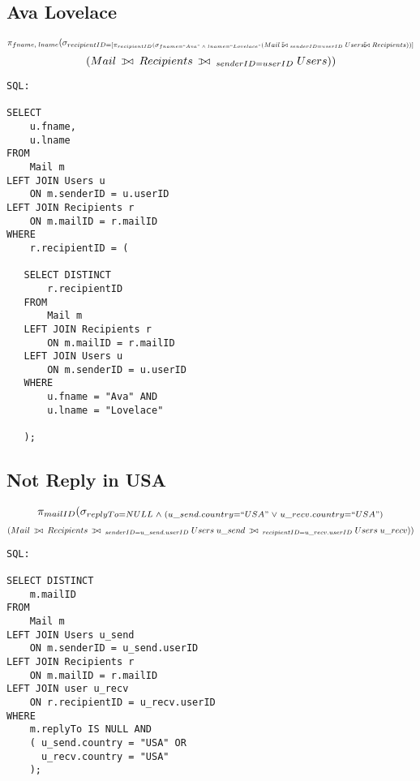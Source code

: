 \documentclass[12pt, letterpaper]{report}
\def\ojoin{\setbox0=\hbox{$\bowtie$}
\rule[-.02ex]{.25em}{.4pt}\llap{\rule[\ht0]{.25em}{.4pt}}}
\def\leftouterjoin{\mathbin{\ojoin\mkern-5.8mu\bowtie}}
\begin{document}
\subsection{Ava Lovelace}


\[ \pi_{fname,\;lname} (\sigma_{recipientID=[\pi_{recipientID} (\sigma_{fname=``Ava"\;\wedge\;lname=``Lovelace"} (Mail\;\leftouterjoin\;_{senderID=userID}\;Users\leftouterjoin\;Recipients ))]} \]
\[ (Mail\;\leftouterjoin\;Recipients\;\leftouterjoin\;_{senderID=userID}\;Users ))  \]


\begin{verbatim}
SQL:

SELECT
    u.fname,
    u.lname
FROM
    Mail m
LEFT JOIN Users u
    ON m.senderID = u.userID
LEFT JOIN Recipients r
    ON m.mailID = r.mailID
WHERE
    r.recipientID = (
    
   SELECT DISTINCT
       r.recipientID
   FROM 
       Mail m
   LEFT JOIN Recipients r
       ON m.mailID = r.mailID
   LEFT JOIN Users u
       ON m.senderID = u.userID
   WHERE
       u.fname = "Ava" AND
       u.lname = "Lovelace"

   );

\end{verbatim}

\subsection{Not Reply in USA}


\[ \pi_{mailID} (\sigma_{replyTo=NULL\;\wedge\;(u\_send.country=``USA"\;\vee\;u\_recv.country=``USA")} \]
\[ (Mail\;\leftouterjoin\;Recipients\;\leftouterjoin\;_{senderID=u\_send.userID}\;Users\;u\_send\;\leftouterjoin\;_{recipientID=u\_recv.userID}\;Users\;u\_recv ))  \]

\begin{verbatim}
SQL:

SELECT DISTINCT
    m.mailID
FROM
    Mail m
LEFT JOIN Users u_send
    ON m.senderID = u_send.userID
LEFT JOIN Recipients r
    ON m.mailID = r.mailID
LEFT JOIN user u_recv
    ON r.recipientID = u_recv.userID
WHERE
    m.replyTo IS NULL AND
    ( u_send.country = "USA" OR
      u_recv.country = "USA"
    );

\end{verbatim}
\end{document}
